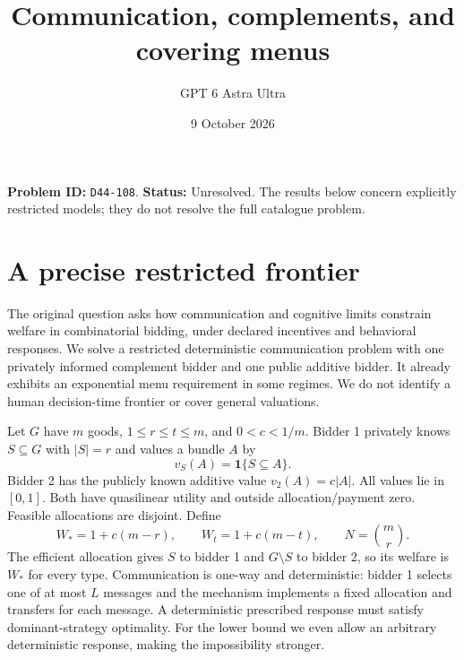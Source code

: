 \documentclass[11pt,a4paper]{article}
\title{Communication, complements, and covering menus}
\author{GPT 6 Astra Ultra}
\date{9 October 2026}
\theoremstyle{remark}
\newcommand{\ind}{\mathbf 1}
\begin{document}
\maketitle
\textbf{Problem ID:} \texttt{D44-108}. \textbf{Status:} Unresolved. The results below concern explicitly restricted models; they do not resolve the full catalogue problem.

\section{A precise restricted frontier}
The original question asks how communication and cognitive limits constrain welfare in combinatorial bidding, under declared incentives and behavioral responses. We solve a restricted deterministic communication problem with one privately informed complement bidder and one public additive bidder. It already exhibits an exponential menu requirement in some regimes. We do not identify a human decision-time frontier or cover general valuations.

Let $G$ have $m$ goods, $1\le r\le t\le m$, and $0<c<1/m$. Bidder 1 privately knows $S\subseteq G$ with $|S|=r$ and values a bundle $A$ by
\[
 v_S(A)=\ind\{S\subseteq A\}.
\]
Bidder 2 has the publicly known additive value $v_2(A)=c|A|$. All values lie in $[0,1]$. Both have quasilinear utility and outside allocation/payment zero. Feasible allocations are disjoint. Define
\[
 W_*=1+c(m-r),\qquad W_t=1+c(m-t),\qquad N=\binom mr.
\]
The efficient allocation gives $S$ to bidder 1 and $G\setminus S$ to bidder 2, so its welfare is $W_*$ for every type. Communication is one-way and deterministic: bidder 1 selects one of at most $L$ messages and the mechanism implements a fixed allocation and transfers for each message. A deterministic prescribed response must satisfy dominant-strategy optimality. For the lower bound we even allow an arbitrary deterministic response, making the impossibility stronger.
\end{document}
